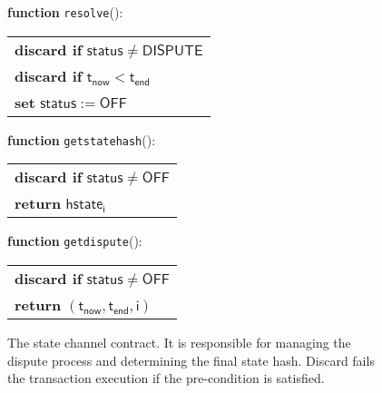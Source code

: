 \documentclass{llncs}
\newcommand{\chanstatus}{\mathsf{status}}
\newcommand{\chandispute}{\mathsf{DISPUTE}}
\newcommand{\chanoff}{\mathsf{OFF}}
\newcommand{\hstatei}{\mathsf{hstate}_{\monotoniccounter}}
\newcommand{\monotoniccounter}{\mathsf{i}}
\newcommand{\timenow}{\mathsf{t}_{\mathsf{now}}}
\newcommand{\timeend}{\mathsf{t}_{\mathsf{end}}}
\newcommand{\oninput}{\textcolor{entry}{\bf function }}
\newcommand{\stringlitt}[1]{\texttt{\textcolor{string}{#1}}}
\begin{document}
\begin{figure}[h]
\begin{boxedminipage}{\columnwidth}
		\begin{flushleft} 
			\oninput \stringlitt{resolve}(): 
		\end{flushleft}
		\begin{tabular}{l}
			\quad \textbf{discard if} $\chanstatus \neq \chandispute$ \\
			\quad \textbf{discard if} $\timenow < \timeend$ \\
			\quad \textbf{set} $\chanstatus := \chanoff$ 
		\end{tabular}
		
		\begin{flushleft} 
			\oninput \stringlitt{getstatehash}(): 
		\end{flushleft}
		\begin{tabular}{l}
			\quad \textbf{discard if} $\chanstatus \neq \chanoff$ \\
			\quad \textbf{return} $\hstatei$
		\end{tabular}
		
		\begin{flushleft} 
			\oninput \stringlitt{getdispute}(): 
		\end{flushleft}
		\begin{tabular}{l}
			\quad \textbf{discard if} $\chanstatus \neq \chanoff$ \\
			\quad \textbf{return} $(\timenow, \timeend, \monotoniccounter)$
		\end{tabular}
	\end{boxedminipage}
	\caption{The state channel contract. It is responsible for managing the dispute process and determining the final state hash.  Discard fails the transaction execution if the pre-condition is satisfied.} \label{fig:statechannel}
\end{figure}
\end{document}
